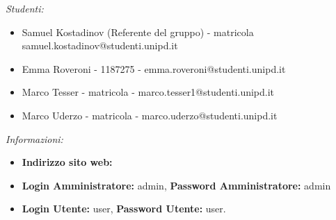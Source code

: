\begin{titlepage}
    \begin{minipage}{1\textwidth}
        \begin{flushleft} \large
            \emph{Studenti:}\\
            \begin{itemize}
            	\item Samuel Kostadinov (Referente del gruppo) - matricola samuel.kostadinov@studenti.unipd.it
            	\item Emma Roveroni - 1187275 - emma.roveroni@studenti.unipd.it
            	\item Marco Tesser - matricola - marco.tesser1@studenti.unipd.it
            	\item Marco Uderzo - matricola - marco.uderzo@studenti.unipd.it
            \end{itemize}
        \end{flushleft}
      \begin{flushleft} \large
      	\emph{Informazioni:}
      	\begin{itemize}
      		\item \textbf{Indirizzo sito web:}
      		\item \textbf{Login Amministratore:} admin, \textbf{Password Amministratore:} admin
      		\item \textbf{Login Utente:} user, \textbf{Password Utente:} user.
      	\end{itemize}
      \end{flushleft}
    \end{minipage}
    
      ~
    
    
   
    
    
    \vfill 
    
\end{titlepage}